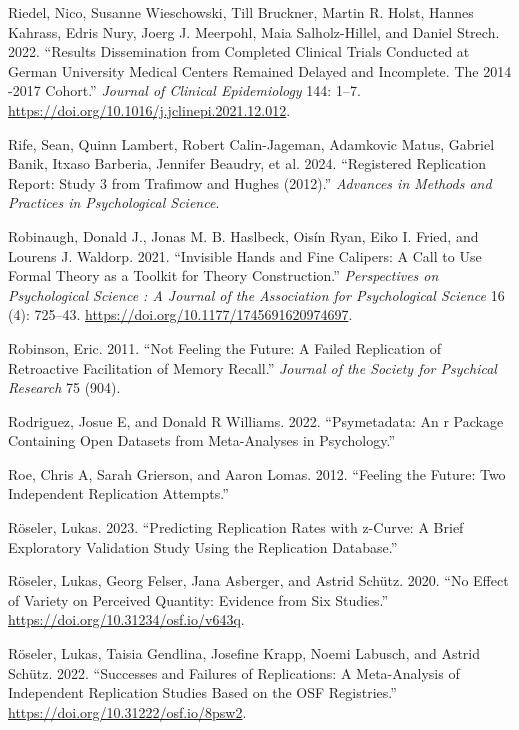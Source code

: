 \documentclass[
  letterpaper,
  DIV=11,
  numbers=noendperiod]{scrreprt}
\newlength{\cslhangindent}
\newenvironment{CSLReferences}[2] %
 {\begin{list}{}{%
  \setlength{\itemindent}{0pt}
  \setlength{\leftmargin}{0pt}
  \setlength{\parsep}{0pt}
  \ifodd #1
   \setlength{\leftmargin}{\cslhangindent}
   \setlength{\itemindent}{-1\cslhangindent}
  \fi
  \setlength{\itemsep}{#2\baselineskip}}}
 {\end{list}}
\begin{document}
\begin{CSLReferences}{1}{0}
Riedel, Nico, Susanne Wieschowski, Till Bruckner, Martin R. Holst,
Hannes Kahrass, Edris Nury, Joerg J. Meerpohl, Maia Salholz-Hillel, and
Daniel Strech. 2022. {``Results Dissemination from Completed Clinical
Trials Conducted at German University Medical Centers Remained Delayed
and Incomplete. The 2014 -2017 Cohort.''} \emph{Journal of Clinical
Epidemiology} 144: 1--7.
\url{https://doi.org/10.1016/j.jclinepi.2021.12.012}.

Rife, Sean, Quinn Lambert, Robert Calin-Jageman, Adamkovic Matus,
Gabriel Banik, Itxaso Barberia, Jennifer Beaudry, et al. 2024.
{``Registered Replication Report: Study 3 from Trafimow and Hughes
(2012).''} \emph{Advances in Methods and Practices in Psychological
Science}.

Robinaugh, Donald J., Jonas M. B. Haslbeck, Oisín Ryan, Eiko I. Fried,
and Lourens J. Waldorp. 2021. {``Invisible Hands and Fine Calipers: A
Call to Use Formal Theory as a Toolkit for Theory Construction.''}
\emph{Perspectives on Psychological Science : A Journal of the
Association for Psychological Science} 16 (4): 725--43.
\url{https://doi.org/10.1177/1745691620974697}.

Robinson, Eric. 2011. {``Not Feeling the Future: A Failed Replication of
Retroactive Facilitation of Memory Recall.''} \emph{Journal of the
Society for Psychical Research} 75 (904).

Rodriguez, Josue E, and Donald R Williams. 2022. {``Psymetadata: An r
Package Containing Open Datasets from Meta-Analyses in Psychology.''}

Roe, Chris A, Sarah Grierson, and Aaron Lomas. 2012. {``Feeling the
Future: Two Independent Replication Attempts.''}

Röseler, Lukas. 2023. {``Predicting Replication Rates with z-Curve: A
Brief Exploratory Validation Study Using the Replication Database.''}

Röseler, Lukas, Georg Felser, Jana Asberger, and Astrid Schütz. 2020.
{``No Effect of Variety on Perceived Quantity: Evidence from Six
Studies.''} \url{https://doi.org/10.31234/osf.io/v643q}.

Röseler, Lukas, Taisia Gendlina, Josefine Krapp, Noemi Labusch, and
Astrid Schütz. 2022. {``Successes and Failures of Replications: A
Meta-Analysis of Independent Replication Studies Based on the OSF
Registries.''} \url{https://doi.org/10.31222/osf.io/8psw2}.


\end{CSLReferences}
\end{document}

